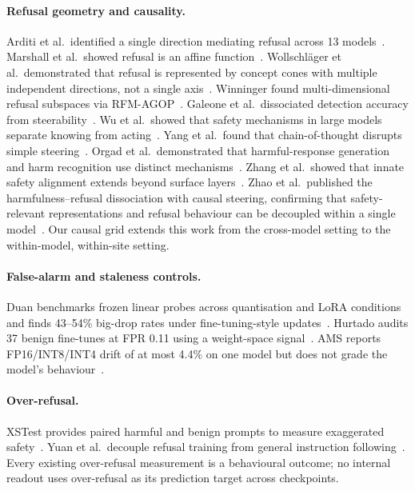 \documentclass[11pt,letterpaper]{article}
\begin{document}
\paragraph{Refusal geometry and causality.}
Arditi et al.\ identified a single direction mediating refusal across 13 models~\citep{Arditi2024}. Marshall et al.\ showed refusal is an affine function~\citep{Marshall2024}. Wollschl\"{a}ger et al.\ demonstrated that refusal is represented by concept cones with multiple independent directions, not a single axis~\citep{Wollschlager2025}. Winninger found multi-dimensional refusal subspaces via RFM-AGOP~\citep{Winninger2026}. Galeone et al.\ dissociated detection accuracy from steerability~\citep{Galeone2026}. Wu et al.\ showed that safety mechanisms in large models separate knowing from acting~\citep{Wu2026}. Yang et al.\ found that chain-of-thought disrupts simple steering~\citep{Yang2026b}. Orgad et al.\ demonstrated that harmful-response generation and harm recognition use distinct mechanisms~\citep{Orgad2026}. Zhang et al.\ showed that innate safety alignment extends beyond surface layers~\citep{Zhang2025}. Zhao et al.\ published the harmfulness--refusal dissociation with causal steering, confirming that safety-relevant representations and refusal behaviour can be decoupled within a single model~\citep{Zhao2025}. Our causal grid extends this work from the cross-model setting to the within-model, within-site setting.

\paragraph{False-alarm and staleness controls.}
Duan benchmarks frozen linear probes across quantisation and LoRA conditions and finds 43--54\% big-drop rates under fine-tuning-style updates~\citep{Duan2026}. Hurtado audits 37 benign fine-tunes at FPR 0.11 using a weight-space signal~\citep{Hurtado2026}. AMS reports FP16/INT8/INT4 drift of at most 4.4\% on one model but does not grade the model's behaviour~\citep{Messenger2026}.

\paragraph{Over-refusal.}
XSTest provides paired harmful and benign prompts to measure exaggerated safety~\citep{Rottger2023}. Yuan et al.\ decouple refusal training from general instruction following~\citep{Yuan2024}. Every existing over-refusal measurement is a behavioural outcome; no internal readout uses over-refusal as its prediction target across checkpoints.
\end{document}
